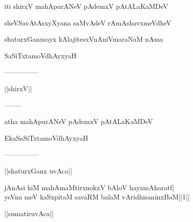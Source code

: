 \documentclass{article}
\begin{document}
\begin{center}
iti shirxV mahApurANeV pAdemxV pAtALaKaMDeV
\end{center}

\begin{center}
sheVSavAtAsxyXyana saMvAdeV rAmAshavxmeVdheV
\end{center}

\begin{center}
shaturxGanxsayx kAlajitesxVnAniVmaraNaM nAma
\end{center}

\begin{center}
SaSiTxtamoVdhAyxyaH
\end{center}

\begin{center}
---------------
\end{center}

\begin{center}
||shirxV||
\end{center}

\begin{center}
--------
\end{center}

\begin{center}
atha mahApurANeV pAdemxV pAtALaKaMDeV
\end{center}

\begin{center}
EkaSaSiTxtamoVdhAyxyaH
\end{center}

\begin{center}
---------------
\end{center}

\begin{center}
||shaturxGanx uvAca||
\end{center}

jAnAsi kiM mahAmaMtirxnokxV bAloV hayamAharatf|\\
yeVna meV kaSxpitaM savaRM balaM vAridhisaninxBaM||1||\\

\begin{center}
||sumatiruvAca||
\end{center}
\end{document}
